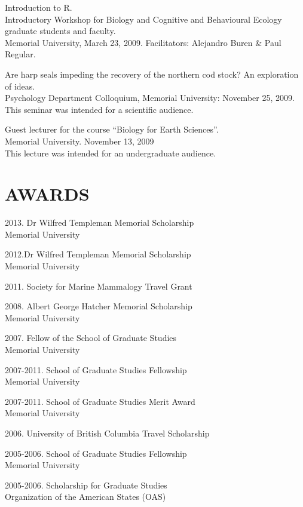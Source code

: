 \documentclass{res}
\begin{document}
\begin{resume}
Introduction to R.\\ Introductory Workshop for Biology and Cognitive and Behavioural Ecology graduate students and faculty. \\Memorial University, March 23, 2009. Facilitators: Alejandro Buren \& Paul Regular.


Are harp seals impeding the recovery of the northern cod stock? An exploration of ideas.\\
Psychology Department Colloquium, Memorial University: November 25, 2009. \\
This seminar was intended for a scientific audience.

Guest lecturer for the course “Biology for Earth Sciences”. \\Memorial University. November 13, 2009 \\
This lecture was intended for an undergraduate audience.
	
\newpage	
\section{AWARDS}
\vspace{0.1in} 
\begin{hangparas}{.4in}{1}
2013. Dr Wilfred Templeman Memorial Scholarship\\
Memorial University

2012.Dr Wilfred Templeman Memorial Scholarship\\
Memorial University

2011. Society for Marine Mammalogy Travel Grant

2008. Albert George Hatcher Memorial Scholarship\\
Memorial University

2007. Fellow of the School of Graduate Studies\\
Memorial University

2007-2011. 
School of Graduate Studies Fellowship \\
Memorial University

2007-2011. School of Graduate Studies Merit Award\\
Memorial University

2006. University of British Columbia Travel Scholarship

2005-2006. School of Graduate Studies Fellowship\\
Memorial University

2005-2006. Scholarship for Graduate Studies\\
Organization of the American States (OAS)


\end{hangparas}
\end{resume}
\end{document}
